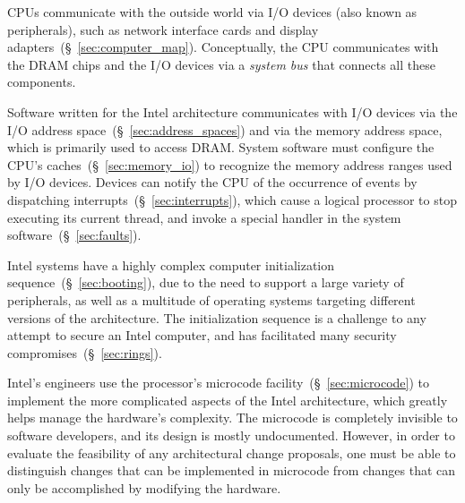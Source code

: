 CPUs communicate with the outside world via I/O devices (also known as
peripherals), such as network interface cards and display
adapters~(\S~\ref{sec:computer_map}). Conceptually, the CPU communicates with
the DRAM chips and the I/O devices via a \textit{system bus} that connects all
these components.

Software written for the Intel architecture communicates with I/O devices via
the I/O address space~(\S~\ref{sec:address_spaces}) and via the memory address
space, which is primarily used to access DRAM. System software must configure
the CPU's caches~(\S~\ref{sec:memory_io}) to recognize the memory address
ranges used by I/O devices. Devices can notify the CPU of the occurrence of
events by dispatching interrupts~(\S~\ref{sec:interrupts}), which cause a
logical processor to stop executing its current thread, and invoke a special
handler in the system software~(\S~\ref{sec:faults}).

Intel systems have a highly complex computer initialization
sequence~(\S~\ref{sec:booting}), due to the need to support a large variety of
peripherals, as well as a multitude of operating systems targeting different
versions of the architecture. The initialization sequence is a challenge to any
attempt to secure an Intel computer, and has facilitated many security
compromises~(\S~\ref{sec:rings}).

Intel's engineers use the processor's microcode
facility~(\S~\ref{sec:microcode}) to implement the more complicated aspects of
the Intel architecture, which greatly helps manage the hardware's complexity.
The microcode is completely invisible to software developers, and its design is
mostly undocumented. However, in order to evaluate the feasibility of any
architectural change proposals, one must be able to distinguish changes that
can be implemented in microcode from changes that can only be accomplished by
modifying the hardware.
